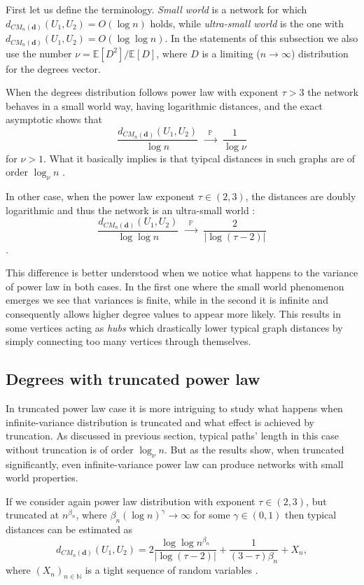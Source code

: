\documentclass[a4paper]{article}
\begin{document}
First let us define the terminology. \emph{Small world} is a network for which $d_{CM_n({\mathbf d})}(U_1, U_2) = O(\log n)$ holds, while \emph{ultra-small world} is the one with $d_{CM_n({\mathbf d})}(U_1, U_2) = O(\log\log n)$. In the statements of this subsection we also use the number $\nu = \mathbb{E}[D^2]/\mathbb{E}[D]$, where $D$ is a limiting ($n \rightarrow \infty$) distribution for the degrees vector.

When the degrees distribution follows power law with exponent $\tau > 3$ the network behaves in a small world way, having logarithmic distances, and the exact asymptotic shows that
$$ \frac{d_{CM_n({\mathbf d})}(U_1, U_2)}{\log n}~~ \xrightarrow{~~\mathbb{P}~~} ~~\frac{1}{\log \nu} $$
for $\nu > 1$. What it basically implies is that tyipcal distances in such graphs are of order $\log_\nu n$ \cite{book_2}.

In other case, when the power law exponent $\tau \in (2, 3)$, the distances are doubly logarithmic and thus the network is an ultra-small world \cite{book_2}:
$$ \frac{d_{CM_n({\mathbf d})}(U_1, U_2)}{\log\log n}~~ \xrightarrow{~~\mathbb{P}~~} ~~\frac{2}{|\log (\tau - 2)|} $$.

This difference is better understood when we notice what happens to the variance of power law in both cases. In the first one where the small world phenomenon emerges we see that variances is finite, while in the second it is infinite and consequently allows higher degree values to appear more likely. This results in some vertices acting as \emph{hubs} which drastically lower typical graph distances by simply connecting too many vertices through themselves.

\subsection{Degrees with truncated power law}

In truncated power law case it is more intriguing to study what happens when infinite-variance distribution is truncated and what effect is achieved by truncation. As discussed in previous section, typical paths' length in this case without truncation is of order $\log_\nu n$. But as the results show, when truncated significantly, even infinite-variance power law can produce networks with small world properties.

If we consider again power law distribution with exponent $\tau \in (2, 3)$, but truncated at $n^{\beta_n}$, where $\beta_n (\log n)^\gamma \rightarrow \infty$ for some $\gamma \in (0, 1)$ then typical distances can be estimated as
$$ d_{CM_n({\mathbf d})}(U_1, U_2) = 2 \frac{\log\log n^{\beta_n}}{|\log (\tau - 2)|} + \frac{1}{(3 - \tau) \beta_n} + X_n,$$
where $(X_n)_{n \in \mathbb{N}}$ is a tight sequence of random variables \cite{paper}.
\end{document}

